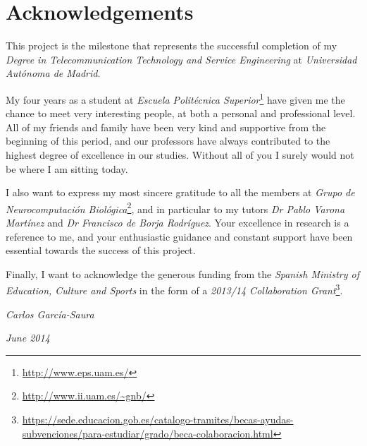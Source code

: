 \chapter*{Acknowledgements}
\vspace{-1cm}

This project is the milestone that represents the successful completion of my \emph{Degree in Telecommunication Technology and Service Engineering} at \emph{Universidad Aut\'{o}noma de Madrid}.

My four years as a student at \emph{Escuela Polit\'{e}cnica Superior}\footnote{\url{http://www.eps.uam.es/}} have given me the chance to meet very interesting people, at both a personal and professional level. All of my friends and family have been very kind and supportive from the beginning of this period, and our professors have always contributed to the highest degree of excellence in our studies.
Without all of you I surely would not be where I am sitting today.

I also want to express my most sincere gratitude to all the members at \emph{Grupo de Neurocomputaci\'{o}n Biol\'{o}gica}\footnote{\url{http://www.ii.uam.es/~gnb/}}, and in particular to my tutors \emph{Dr Pablo Varona Mart\'{i}nez} and \emph{Dr Francisco de Borja Rodr\'{i}guez}. Your excellence in research is a reference to me, and your enthusiastic guidance and constant support have been essential towards the success of this project.

Finally, I want to acknowledge the generous funding from the \emph{Spanish Ministry of Education, Culture and Sports} in the form of a \emph{2013/14 Collaboration Grant}\footnote{\url{https://sede.educacion.gob.es/catalogo-tramites/becas-ayudas-subvenciones/para-estudiar/grado/beca-colaboracion.html}}.


\vspace{0.5cm}
\hfill \emph{Carlos Garc\'{i}a-Saura}

\hfill \emph{June 2014}


